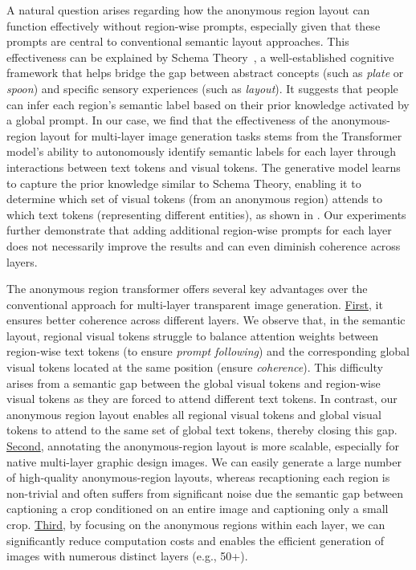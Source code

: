 A natural question arises regarding how the anonymous region layout can function effectively without region-wise prompts, especially given that these prompts are central to conventional semantic layout approaches. This effectiveness can be explained by Schema Theory~\cite{bartlett1995remembering,rumelhart2017schemata,kant1934critique,axelrod1973schema}, a well-established cognitive framework that helps bridge the gap between abstract concepts (such as \emph{plate} or \emph{spoon}) and specific sensory experiences (such as \emph{layout}). It suggests that people can infer each region's semantic label based on their prior knowledge activated by a global prompt. In our case, we find that the effectiveness of the anonymous-region layout for multi-layer image generation tasks stems from the Transformer model’s ability to autonomously identify semantic labels for each layer through interactions between text tokens and visual tokens. The generative model learns to capture the prior knowledge similar to Schema Theory, enabling it to determine which set of visual tokens (from an anonymous region) attends to which text tokens (representing different entities), as shown in . Our experiments further demonstrate that adding additional region-wise prompts for each layer does not necessarily improve the results and can even diminish coherence across layers.

The anonymous region transformer offers several key advantages over the conventional approach for multi-layer transparent image generation. \underline{First}, it ensures better coherence across different layers. We observe that, in the semantic layout, regional visual tokens struggle to balance attention weights between region-wise text tokens (to ensure \emph{prompt following}) and the corresponding global visual tokens located at the same position (ensure \emph{coherence}). This difficulty arises from a semantic gap between the global visual tokens and region-wise visual tokens as they are forced to attend different text tokens. In contrast, our anonymous region layout enables all regional visual tokens and global visual tokens to attend to the same set of global text tokens, thereby closing this gap. \underline{Second}, annotating the anonymous-region layout is more scalable, especially for native multi-layer graphic design images. We can easily generate a large number of high-quality anonymous-region layouts, whereas recaptioning each region is non-trivial and often suffers from significant noise due the semantic gap between captioning a crop conditioned on an entire image and captioning only a small crop. \underline{Third}, by focusing on the anonymous regions within each layer, we can significantly reduce computation costs and enables the efficient generation of images with numerous distinct layers (e.g., 50+).

